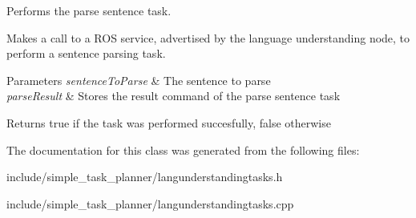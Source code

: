 Performs the parse sentence task. 

Makes a call to a R\+OS service, advertised by the language understanding node, to perform a sentence parsing task.


\begin{DoxyParams}{Parameters}
{\em sentence\+To\+Parse} & The sentence to parse \\
\hline
{\em parse\+Result} & Stores the result command of the parse sentence task \\
\hline
\end{DoxyParams}
\begin{DoxyReturn}{Returns}
true if the task was performed succesfully, false otherwise 
\end{DoxyReturn}


The documentation for this class was generated from the following files\+:\begin{DoxyCompactItemize}
\item 
include/simple\+\_\+task\+\_\+planner/langunderstandingtasks.\+h\item 
include/simple\+\_\+task\+\_\+planner/langunderstandingtasks.\+cpp\end{DoxyCompactItemize}
